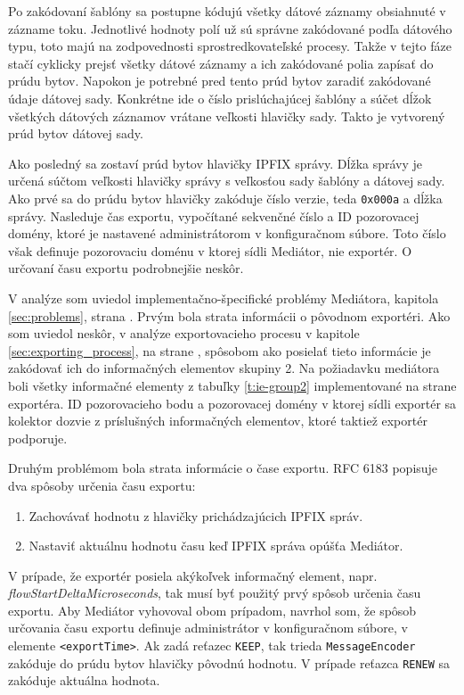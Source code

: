Po zakódovaní šablóny sa postupne kódujú všetky dátové záznamy obsiahnuté v zázname toku. Jednotlivé 
hodnoty polí už sú správne zakódované podľa dátového typu, toto majú na zodpovednosti sprostredkovateľské
procesy. Takže v tejto fáze stačí cyklicky prejsť všetky dátové záznamy a ich zakódované polia zapísať 
do prúdu bytov. Napokon je potrebné pred tento prúd bytov zaradiť zakódované údaje dátovej sady. Konkrétne
ide o číslo prislúchajúcej šablóny a súčet dĺžok všetkých dátových záznamov vrátane veľkosti hlavičky sady.
Takto je vytvorený prúd bytov dátovej sady.

Ako posledný sa zostaví prúd bytov hlavičky IPFIX správy. Dĺžka správy je určená súčtom veľkosti hlavičky
správy s veľkosťou sady šablóny a dátovej sady. Ako prvé sa do prúdu bytov hlavičky zakóduje číslo 
verzie, teda \verb|0x000a| a dĺžka správy. Nasleduje čas exportu, vypočítané sekvenčné číslo a ID 
pozorovacej domény, ktoré je nastavené administrátorom v konfiguračnom súbore. Toto číslo však definuje
pozorovaciu doménu v ktorej sídli Mediátor, nie exportér. O určovaní času exportu podrobnejšie neskôr.

V analýze som uviedol implementačno-špecifické problémy Mediátora, kapitola \ref{sec:problems}, strana 
\pageref{sec:problems}. Prvým bola strata informácii o pôvodnom exportéri. Ako som uviedol neskôr, v analýze
exportovacieho procesu v kapitole \ref{sec:exporting_process}, na strane \pageref{sec:exporting_process},
spôsobom ako posielať tieto informácie je zakódovať ich do informačných elementov skupiny 2. Na požiadavku
mediátora boli všetky informačné elementy z tabuľky \ref{t:ie-group2} implementované na strane exportéra.
ID pozorovacieho bodu a pozorovacej domény v ktorej sídli exportér sa kolektor dozvie z príslušných 
informačných elementov, ktoré taktiež exportér podporuje. 

Druhým problémom bola strata informácie o čase exportu. RFC 6183 \citep{rfc6183} popisuje dva spôsoby 
určenia času exportu:
\begin{enumerate}
 \item Zachovávať hodnotu z hlavičky prichádzajúcich IPFIX správ.
 \item Nastaviť aktuálnu hodnotu času keď IPFIX správa opúšťa Mediátor.
\end{enumerate}
V prípade, že exportér posiela akýkoľvek  informačný element, napr. \emph{flowStartDeltaMicroseconds},
tak musí byť použitý prvý spôsob určenia času exportu. Aby Mediátor vyhovoval obom prípadom, navrhol som,
že spôsob určovania času exportu definuje administrátor v konfiguračnom súbore, v elemente \verb|<exportTime>|. 
Ak zadá reťazec \verb|KEEP|, tak trieda \verb|MessageEncoder| zakóduje do prúdu bytov hlavičky pôvodnú
hodnotu. V prípade reťazca \verb|RENEW| sa zakóduje aktuálna hodnota.

